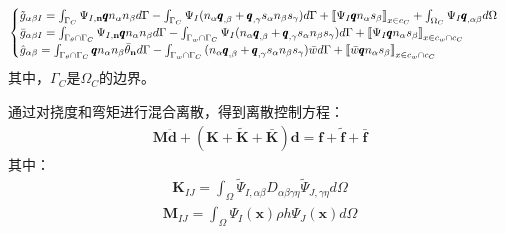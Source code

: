 \documentclass[11pt,a4paper]{article}
\begin{document}
\begin{equation}
    \begin{split}
    \begin{cases}
    {\tilde g}_{\alpha\beta I} = \int_{{\Gamma _C}}^{}{{\Psi _{I,{\bf{n}}}}{\pmb{q}}{n_\alpha }{n_\beta }d\Gamma }-\int_{{\Gamma _C}}^{}{{\Psi _I}({n_\alpha }{{\pmb{q}}_{,\beta }} + {{\pmb{q}}_{,\gamma }}{s_\alpha}{n_\beta }{s_\gamma})d\Gamma }  + {\left[\kern-0.15em\left[ {{\Psi _I}{\pmb{q}}{n_\alpha }{s_\beta }} 
     \right]\kern-0.15em\right]_{{{x}} \in {c_C}}} + \int_{{\Omega _C}}^{} {{\Psi _I}{{\pmb{q}}_{,\alpha \beta }}d\Omega } \\
    {\bar g}_{\alpha \beta I} = \int_{{\Gamma _\theta } \cap {\Gamma _C}}^{} {{\Psi _{I,{\bf{n}}}}{\pmb{q}}{n_\alpha }{n_\beta }d\Gamma }  - \int_{{\Gamma _w} \cap {\Gamma _C}}^{} {{\Psi _I}({n_\alpha }{{\pmb{q}}_{,\beta }} + {{\pmb{q}}_{,\gamma }}{s_\alpha }{n_\beta }{s_\gamma })d\Gamma }  + {\left[\kern-0.15em\left[ {{\Psi _I}{\pmb{q}}{n_\alpha }{s_\beta }} 
     \right]\kern-0.15em\right]_{{{x}} \in {c_w} \cap {c_C}}}\\
    \hat{g}_{\alpha \beta }= \int_{{\Gamma _\theta } \cap {\Gamma _C}}^{} {{\pmb{q}}{n_\alpha }{n_\beta }{{\bar \theta }_{\bf{n}}}d\Gamma }  - \int_{{\Gamma _w} \cap {\Gamma _C}}^{} {({n_\alpha }{{\pmb{q}}_{,\beta }} + {{\pmb{q}}_{,\gamma }}{s_\alpha }{n_\beta }{s_\gamma })\bar wd\Gamma }  + {\left[\kern-0.15em\left[ {\bar w{\pmb{q}}{n_\alpha }{s_\beta }} 
     \right]\kern-0.15em\right]_{{{x}} \in {c_w} \cap {c_C}}}
     \end{cases}
    \end{split}
    \end{equation}
其中，$\Gamma_C$是$\Omega_C$的边界。\par
通过对挠度和弯矩进行混合离散，得到离散控制方程：
\begin{equation}
\begin{split}
    \pmb{M}\ddot{\pmb d}+(\pmb{K}+\pmb{\tilde{K}}+\pmb{\bar{K}})\pmb{d}=\pmb{f}+\pmb{\tilde{f}}+\pmb{\bar f}
\end{split}
\end{equation}
其中：
\begin{equation}
\begin{split}
    \pmb{K}_{IJ}=\int_{\Omega}\tilde{\Psi}_{I,\alpha\beta}D_{\alpha\beta\gamma\eta}\tilde{\Psi}_{J,\gamma\eta}d\Omega  
\end{split}
\end{equation}
\begin{equation}
\begin{split}
    \pmb{M}_{IJ}=\int_{\Omega}\Psi_I(\pmb{x})\rho h\Psi_J(\pmb{x})d\Omega
\end{split}
\end{equation}
\end{document}
